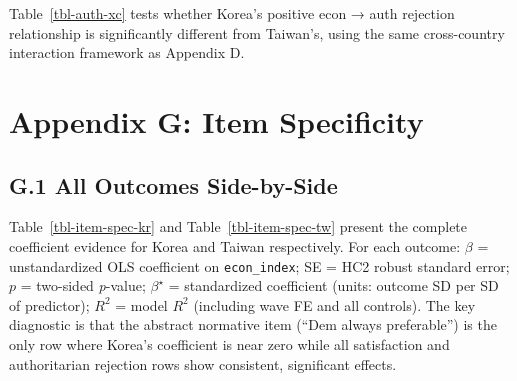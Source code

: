 \documentclass[
  12pt,
  letterpaper]{article}
\begin{document}
Table~\ref{tbl-auth-xc} tests whether Korea's positive econ → auth
rejection relationship is significantly different from Taiwan's, using
the same cross-country interaction framework as Appendix D.

\begin{table}

\caption{\label{tbl-auth-xc}Cross-country interaction: econ \(\times\)
Korea on authoritarian rejection index}


\end{table}%

\section{Appendix G: Item
Specificity}\label{appendix-g-item-specificity}

\subsection{G.1 All Outcomes
Side-by-Side}\label{g.1-all-outcomes-side-by-side}

Table~\ref{tbl-item-spec-kr} and Table~\ref{tbl-item-spec-tw} present
the complete coefficient evidence for Korea and Taiwan respectively. For
each outcome: \(\beta\) = unstandardized OLS coefficient on
\texttt{econ\_index}; SE = HC2 robust standard error; \(p\) = two-sided
\emph{p}-value; \(\beta^\star\) = standardized coefficient (units:
outcome SD per SD of predictor); \(R^2\) = model \(R^2\) (including wave
FE and all controls). The key diagnostic is that the abstract normative
item (``Dem always preferable'') is the only row where Korea's
coefficient is near zero while all satisfaction and authoritarian
rejection rows show consistent, significant effects.
\end{document}

